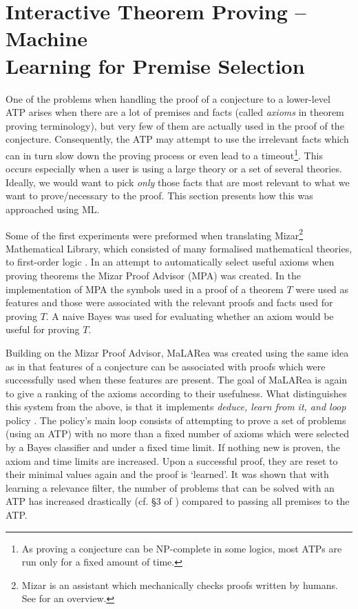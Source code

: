 \documentclass{article}
\begin{document}
\section{Interactive Theorem Proving -- Machine \\ Learning for Premise Selection}\label{sec:ITP}

One of the problems when handling the proof of a conjecture to a lower-level
ATP arises when there are a lot of premises and facts (called \emph{axioms} in
theorem proving terminology), but very few of them are actually used in the
proof of the conjecture. Consequently, the ATP may attempt to use the
irrelevant facts which can in turn slow down the proving process or even lead
to a timeout\footnote{As proving a conjecture can be NP-complete in some
logics, most ATPs are run only for a fixed amount of time.}. This occurs
especially when a user is using a large theory or a set of several theories.
Ideally, we would want to pick \emph{only} those facts that are most relevant
to what we want to prove/necessary to the proof. This section presents how this
was approached using ML.

Some of the first experiments were preformed when translating
Mizar\footnote{Mizar is an assistant which mechanically checks proofs written
by humans. See \cite{MizarOverview} for an overview.} Mathematical Library,
which consisted of many formalised mathematical theories, to first-order logic
\citep{MizarProofAdvisor}. In an attempt to automatically select useful axioms
when proving theorems the Mizar Proof Advisor (MPA) was created. In the
implementation of MPA the symbols used in a proof of a theorem $T$ were used as
features and those were associated with the relevant proofs and facts used for
proving $T$. A naive Bayes was used for evaluating whether an axiom would be
useful for proving $T$. 

Building on the Mizar Proof Advisor, MaLARea \citep{MaLARea} was created using
the same idea as in \cite{MizarProofAdvisor} that features of a conjecture can
be associated with proofs which were successfully used when these features are
present. The goal of MaLARea is again to give a ranking of the axioms according
to their usefulness. What distinguishes this system from the above, is that it
implements \emph{deduce, learn from it, and loop} policy \citep[p.~3]{MaLARea}.
The policy's main loop consists of attempting to prove a set of problems (using
an ATP) with no more than a fixed number of axioms which were selected by
a Bayes classifier and under a fixed time limit. If nothing new is proven, the
axiom and time limits are increased. Upon a successful proof, they are reset to
their minimal values again and the proof is `learned'. It was shown that with
learning a relevance filter, the number of problems that can be solved with
an ATP has increased drastically (cf. \S 3 of \cite{MaLARea}) compared to
passing all premises to the ATP.
\end{document}
